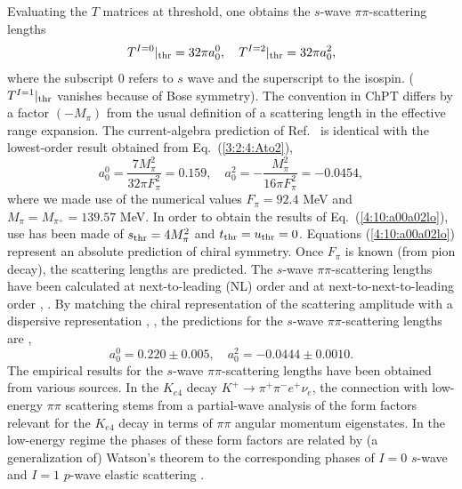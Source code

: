 \documentclass[twoside,12pt]{article}
\begin{document}
   Evaluating the $T$ matrices at threshold, one obtains the $s$-wave
$\pi\pi$-scattering lengths
\begin{equation}
\label{$:10:swsl}
T^{I=0}|_{\rm thr}=32\pi a^0_0,\quad T^{I=2}|_{\rm thr}=32\pi a^2_0,
\end{equation}
   where the subscript $0$ refers to $s$ wave and the superscript to
the isospin.
   ($T^{I=1}|_{\rm thr}$ vanishes because of Bose symmetry).
    The convention in
ChPT differs by a factor $(-M_\pi)$ from the usual definition of a
scattering length in the effective range expansion.
   The current-algebra prediction of Ref.\ \cite{Weinberg:1966kf} is identical
with the lowest-order result obtained from Eq.\ (\ref{3:2:4:Ato2}),
\begin{equation}
\label{4:10:a00a02lo}
a_0^0=\frac{7 M_\pi^2}{32 \pi F_\pi^2}=0.159,\quad
a_0^2=-\frac{M_\pi^2}{16 \pi F_\pi^2}=-0.0454,
\end{equation}
   where we made use of the numerical values
$F_\pi=92.4$ MeV and $M_\pi=M_{\pi^+}=139.57$ MeV.
   In order to obtain the results of Eq.\ (\ref{4:10:a00a02lo}), use has
been made of $s_{\rm thr}=4 M_\pi^2$ and $t_{\rm thr}=u_{\rm thr}=0$.
   Equations (\ref{4:10:a00a02lo}) represent an absolute prediction of chiral symmetry.
   Once $F_\pi$ is known (from pion decay), the scattering lengths are predicted.
   The $s$-wave $\pi\pi$-scattering lengths have been calculated at next-to-leading (NL) order
\cite{Gasser:1983yg} and at next-to-next-to-leading order \cite{Bijnens:1995yn},
\cite{Bijnens:1997vq}.
   By matching the chiral representation of the scattering amplitude with a dispersive
representation \cite{Roy:1971tc}, \cite{Ananthanarayan:2000ht},
the predictions for the $s$-wave $\pi\pi$-scattering lengths are
\cite{Colangelo:2000jc}, \cite{Colangelo:2001df}
\begin{equation}
\label{4:2:4:a00a02disp}
a_0^0=0.220\pm 0.005,\quad
a_0^2=-0.0444\pm0.0010.
\end{equation}
   The empirical results for the $s$-wave $\pi\pi$-scattering lengths
have been obtained from various sources.
   In the $K_{e4}$ decay $K^+\to\pi^+\pi^-e^+\nu_e$, the connection with
low-energy $\pi\pi$ scattering stems from a partial-wave analysis of the form factors
relevant for the $K_{e4}$ decay in terms of $\pi\pi$ angular momentum eigenstates.
   In the low-energy regime the phases of these form factors are related by
(a generalization of) Watson's theorem \cite{Watson:1954uc} to the
corresponding phases of $I=0$ $s$-wave and $I=1$ $p$-wave elastic
scattering \cite{Colangelo:2001sp}.
\end{document}

